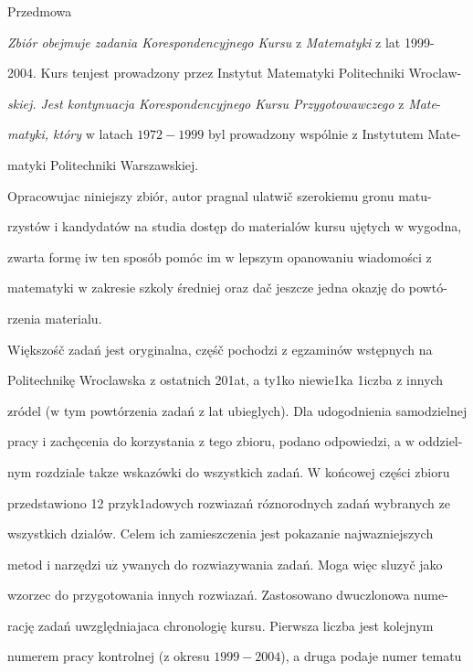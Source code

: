\documentclass[a4paper,12pt]{article}
\begin{document}
Przedmowa

{\it Zbiór obejmuje zadania Korespondencyjnego Kursu} $\mathrm{z}$ {\it Matematyki} $\mathrm{z}$ lat 1999-

2004. Kurs tenjest prowadzony przez Instytut Matematyki Politechniki Wroclaw-

{\it skiej. Jest kontynuacja Korespondencyjnego Kursu Przygotowawczego} $\mathrm{z}$ {\it Mate}-

{\it matyki, który} $\mathrm{w}$ latach $1972-1999$ byl prowadzony wspólnie $\mathrm{z}$ Instytutem Mate-

matyki Politechniki Warszawskiej.

Opracowujac niniejszy zbiór, autor pragnal ulatwič szerokiemu gronu matu-

rzystów $\mathrm{i}$ kandydatów na studia dostęp do materialów kursu ujętych $\mathrm{w}$ wygodna,

zwarta formę $\mathrm{i}\mathrm{w}$ ten sposób pomóc im $\mathrm{w}$ lepszym opanowaniu wiadomości $\mathrm{z}$

matematyki $\mathrm{w}$ zakresie szkoly średniej oraz dač jeszcze jedna okazję do powtó-

rzenia materialu.

Większośč zadań jest oryginalna, częśč pochodzi $\mathrm{z}$ egzaminów wstępnych na

Politechnikę Wroclawska $\mathrm{z}$ ostatnich 201at, a ty1ko niewie1ka 1iczba $\mathrm{z}$ innych

z$\acute{}$ródel ($\mathrm{w}$ tym powtórzenia zadań $\mathrm{z}$ lat ubieglych). Dla udogodnienia samodzielnej

pracy $\mathrm{i}$ zachęcenia do korzystania $\mathrm{z}$ tego zbioru, podano odpowiedzi, a $\mathrm{w}$ oddziel-

nym rozdziale takze wskazówki do wszystkich zadań. $\mathrm{W}$ końcowej części zbioru

przedstawiono 12 przyk1adowych rozwiazań róznorodnych zadań wybranych ze

wszystkich dzialów. Celem ich zamieszczenia jest pokazanie najwazniejszych

metod $\mathrm{i}$ narzędzi $\mathrm{u}\dot{\mathrm{z}}$ ywanych do rozwiazywania zadań. Moga więc sluzyč jako

wzorzec do przygotowania innych rozwiazań. Zastosowano dwuczlonowa nume-

rację zadań uwzględniajaca chronologię kursu. Pierwsza liczba jest kolejnym

numerem pracy kontrolnej ($\mathrm{z}$ okresu $1999-2004$), a druga podaje numer tematu
\end{document}
